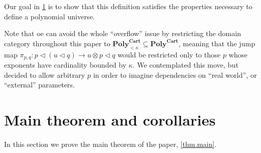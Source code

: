 \documentclass[11pt, one side, article]{memoir}
\theoremstyle{definition}
\theoremstyle{plain}
\renewcommand{\ss}{\subseteq}
\newcommand{\Cat}[1]{\mathbf{#1}}%
\newcommand{\poly}{\Cat{Poly}}
\newcommand{\polycart}{\poly^{\Cat{Cart}}}
\newcommand{\0}{\textsf{0}}
\newcommand{\1}{\tn{\textsf{1}}}
\newcommand{\tri}{\mathbin{\triangleleft}}
\newcommand{\jump}{\pi}
\begin{document}
Our goal in \cref{sec.main_thm} is to show that this definition satisfies the properties necessary to define a polynomial universe. 

Note that oe can avoid the whole ``overflow'' issue by restricting the domain category throughout this paper to $\polycart_{<\kappa}\ss\polycart$, meaning that the jump map $\jump_{p,q}\colon p\tri (u\tri q)\to u\otimes p\tri q$ would be restricted only to those $p$ whose exponents have cardinality bounded by $\kappa$. We contemplated this move, but decided to allow arbitrary $p$ in order to imagine dependencies on ``real world'', or ``external'' parameters.

\section{Main theorem and corollaries}\label{sec.main_thm}

In this section we prove the main theorem of the paper, \cref{thm.main}.
\end{document}
